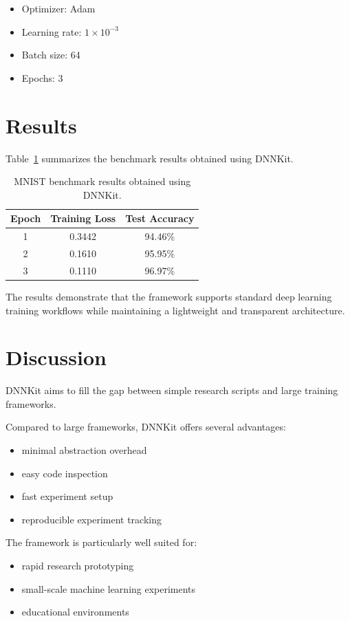 \documentclass{article}
\begin{document}
\begin{itemize}
\item Optimizer: Adam
\item Learning rate: $1 \times 10^{-3}$
\item Batch size: 64
\item Epochs: 3
\end{itemize}

\section{Results}

Table~\ref{tab:results} summarizes the benchmark results obtained using DNNKit.

\begin{table}[h]
\centering
\begin{tabular}{ccc}
\toprule
Epoch & Training Loss & Test Accuracy \\
\midrule
1 & 0.3442 & 94.46\% \\
2 & 0.1610 & 95.95\% \\
3 & 0.1110 & 96.97\% \\
\bottomrule
\end{tabular}
\caption{MNIST benchmark results obtained using DNNKit.}
\label{tab:results}
\end{table}

The results demonstrate that the framework supports standard deep learning training workflows
while maintaining a lightweight and transparent architecture.

\section{Discussion}

DNNKit aims to fill the gap between simple research scripts and large training frameworks.

Compared to large frameworks, DNNKit offers several advantages:

\begin{itemize}
\item minimal abstraction overhead
\item easy code inspection
\item fast experiment setup
\item reproducible experiment tracking
\end{itemize}

The framework is particularly well suited for:

\begin{itemize}
\item rapid research prototyping
\item small-scale machine learning experiments
\item educational environments
\end{itemize}
\end{document}
